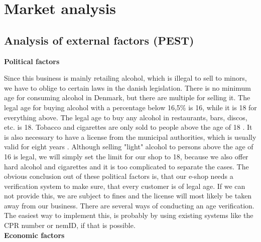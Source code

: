 \documentclass[12p]{article}
\begin{document}
\newpage
\section{Market analysis} \label{MarketAnalysis}


\subsection{Analysis of external factors (PEST)} \label{PEST}

\textbf{Political factors}

Since this business is mainly retailing alcohol, which is illegal to sell to minors, we have to oblige to certain laws in the danish legislation. There is no minimum age for consuming alcohol in Denmark, but there are multiple for selling it. The legal age for buying alcohol with a percentage below 16,5\% is 16, while it is 18 for everything above. The legal age to buy any alcohol in restaurants, bars, discos, etc. is 18. Tobacco and cigarettes are only sold to people above the age of 18 \cite{PEST_AlcoholAndTobaccoLegalAge}. It is also necessary to have a license from the municipal authorities, which is usually valid for eight years \cite{PEST_DenmarkAlcoholLaws}. Although selling "light" alcohol to persons above the age of 16 is legal, we will simply set the limit for our shop to 18, because we also offer hard alcohol and cigarettes and it is too complicated to separate the cases. The obvious conclusion out of these political factors is, that our e-shop needs a verification system to make sure, that every customer is of legal age. If we can not provide this, we are subject to fines and the license will most likely be taken away from our business. There are several ways of conducting an age verification. The easiest way to implement this, is probably by using existing systems like the CPR number or nemID, if that is possible. \\

\textbf{Economic factors}
\end{document}
